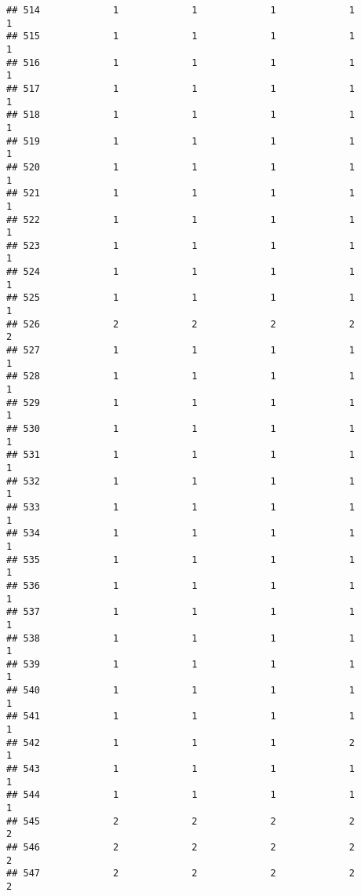 \documentclass[
]{article}
\begin{document}
\begin{verbatim}
## 514             1             1             1             1             1
## 515             1             1             1             1             1
## 516             1             1             1             1             1
## 517             1             1             1             1             1
## 518             1             1             1             1             1
## 519             1             1             1             1             1
## 520             1             1             1             1             1
## 521             1             1             1             1             1
## 522             1             1             1             1             1
## 523             1             1             1             1             1
## 524             1             1             1             1             1
## 525             1             1             1             1             1
## 526             2             2             2             2             2
## 527             1             1             1             1             1
## 528             1             1             1             1             1
## 529             1             1             1             1             1
## 530             1             1             1             1             1
## 531             1             1             1             1             1
## 532             1             1             1             1             1
## 533             1             1             1             1             1
## 534             1             1             1             1             1
## 535             1             1             1             1             1
## 536             1             1             1             1             1
## 537             1             1             1             1             1
## 538             1             1             1             1             1
## 539             1             1             1             1             1
## 540             1             1             1             1             1
## 541             1             1             1             1             1
## 542             1             1             1             2             1
## 543             1             1             1             1             1
## 544             1             1             1             1             1
## 545             2             2             2             2             2
## 546             2             2             2             2             2
## 547             2             2             2             2             2

\end{verbatim}
\end{document}
